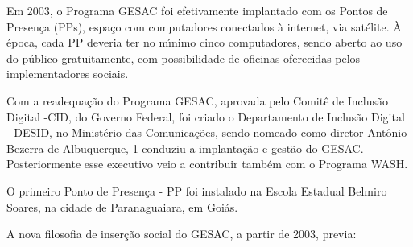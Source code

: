 \documentclass[
12pt,		%
openright,	%
twoside,  %
a4paper,			%
chapter=TITLE,		%
english,			%
french,				%
spanish,			%
brazil				%
]{USPSC-classe/USPSC}
\begin{document}
Em 2003, o Programa GESAC foi efetivamente implantado com os Pontos de Presen\c{c}a (PPs), espa\c{c}o com  computadores conectados \`a internet, via sat\'elite. \`A \'epoca, cada PP deveria ter no m\'{\i}nimo cinco computadores, sendo aberto ao  uso do p\'ublico gratuitamente, com possibilidade de oficinas oferecidas pelos implementadores sociais.









Com a readequa\c{c}\~ao do Programa GESAC, aprovada pelo Comit\^e de Inclus\~ao Digital -CID, do Governo Federal,  foi criado o Departamento de Inclus\~ao Digital - DESID, no Minist\'erio das Comunica\c{c}\~oes, sendo nomeado como diretor Ant\^onio Bezerra de Albuquerque, 1 conduziu a implanta\c{c}\~ao e gest\~ao do GESAC. Posteriormente esse executivo veio a contribuir tamb\'em com o Programa WASH.









O primeiro Ponto de Presen\c{c}a - PP foi  instalado na  Escola Estadual Belmiro Soares, na cidade de Paranaguaiara, em  Goi\'as.









A nova filosofia  de inser\c{c}\~ao social do GESAC, a partir de 2003, previa:
\end{document}
